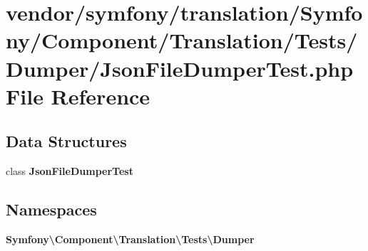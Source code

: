 \section{vendor/symfony/translation/\+Symfony/\+Component/\+Translation/\+Tests/\+Dumper/\+Json\+File\+Dumper\+Test.php File Reference}
\label{_json_file_dumper_test_8php}
\subsection*{Data Structures}
\begin{DoxyCompactItemize}
\item 
class {\bf Json\+File\+Dumper\+Test}
\end{DoxyCompactItemize}
\subsection*{Namespaces}
\begin{DoxyCompactItemize}
\item 
 {\bf Symfony\textbackslash{}\+Component\textbackslash{}\+Translation\textbackslash{}\+Tests\textbackslash{}\+Dumper}
\end{DoxyCompactItemize}
